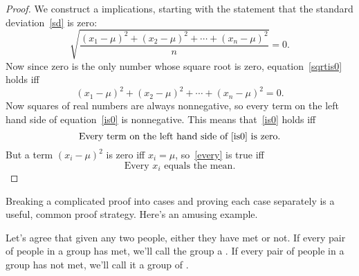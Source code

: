 \begin{proof}
We construct a  implications, starting with the
statement that the standard deviation~\eqref{sd} is zero:
%
\begin{equation}\label{sqrtis0}
\sqrt{\frac{(x_1 - \mu)^2 + (x_2 - \mu)^2 + \cdots + (x_n - \mu)^2}{n}} = 0.
\end{equation}
%
Now since zero is the only number whose square root is zero,
equation~\eqref{sqrtis0} holds iff
\begin{equation}\label{is0}
(x_1 - \mu)^2 + (x_2 - \mu)^2 + \cdots + (x_n - \mu)^2 = 0.
\end{equation}
Now squares of real numbers are always nonnegative, so every term on the
left hand side of equation~\eqref{is0} is nonnegative.  This means
that~\eqref{is0} holds iff
\begin{equation}\label{every}
\text{Every term on the left hand side of~\eqref{is0} is zero.}
\end{equation}
But a term $(x_i - \mu)^2$ is zero iff $x_i=\mu$, so~\eqref{every} is true
iff
\[
\text{Every $x_i$ equals the mean.}
\]

\end{proof}

\iffalse

\begin{notesproblem}
Reformulate the proof of the Distributive Law for Sets as a chain of
if-and-only-if implications.
\end{notesproblem}
\fi



Breaking a complicated proof into cases and proving each case separately
is a useful, common proof strategy.  Here's an amusing example.

Let's agree that given any two people, either they have met or not.  If
every pair of people in a group has met, we'll call the group a
.  If every pair of people in a group has not met, we'll call
it a group of .

